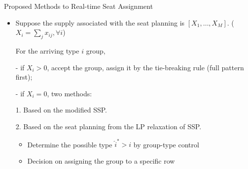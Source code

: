   \begin{frame}{Proposed Methods to Real-time Seat Assignment}

    \begin{itemize}
      \item Suppose the supply associated with the seat planning is $[X_{1}, \ldots, X_M]$. ($X_{i} = \sum_{j} x_{ij}, \forall i$)
      
      \vspace{0.5cm}

      For the arriving type $i$ group,

      \item[-] if $X_i > 0$, accept the group, assign it by the tie-breaking rule (full pattern first);
      
      \item[-] if $X_i = 0$, two methods:
      
      \vspace{0.5cm}

      1. Based on the modified SSP.
      \vspace{0.5cm}

      2. Based on the seat planning from the LP relaxation of SSP.
      \begin{itemize}
        \item Determine the possible type $\hat{i}^{*}>i$ by group-type control
        \item Decision on assigning the group to a specific row
      \end{itemize}
    \end{itemize}
  \end{frame}

